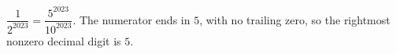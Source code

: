$\dfrac{1}{2^{2023}}=\dfrac{5^{2023}}{10^{2023}}$. The numerator ends in $5$, with no trailing zero, so the rightmost nonzero decimal digit is $\boxed5$.
